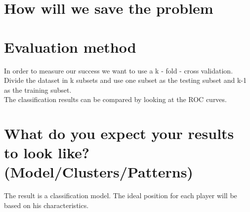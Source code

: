 \documentclass[runningheads]{llncs}
\begin{document}

\section{How will we save the problem}

\section{Evaluation method}
In order to measure our success we want to use a k - fold - cross validation. \\
Divide the dataset in k subsets and use one subset as the testing subset and k-1 as the training subset. \\
The classification results can be compared by looking at the ROC curves.


\section{What do you expect your results to look like? (Model/Clusters/Patterns)}
The result is a classification model. The ideal position for each player will be based on his characteristics.




%
%
% 
% 
%
%
%
%
%
\end{document}
